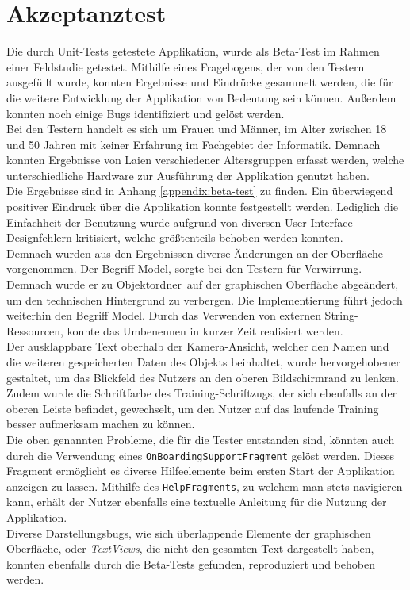 \documentclass[oneside]{ausarbeitung}
\begin{document}
\section{Akzeptanztest}
Die durch Unit-Tests getestete Applikation, wurde als Beta-Test im Rahmen einer Feldstudie getestet. Mithilfe eines Fragebogens, der von den Testern ausgefüllt wurde, konnten Ergebnisse und Eindrücke gesammelt werden, die für die weitere Entwicklung der Applikation von Bedeutung sein können. Außerdem konnten noch einige Bugs identifiziert und gelöst werden.\\
Bei den Testern handelt es sich um Frauen und Männer, im Alter zwischen 18 und 50 Jahren mit keiner Erfahrung im Fachgebiet der Informatik. Demnach konnten Ergebnisse von Laien verschiedener Altersgruppen erfasst werden, welche unterschiedliche Hardware zur Ausführung der Applikation genutzt haben.\\
Die Ergebnisse sind in Anhang \ref{appendix:beta-test} zu finden. Ein überwiegend positiver Eindruck über die Applikation konnte festgestellt werden. Lediglich die Einfachheit der Benutzung wurde aufgrund von diversen User-Interface-Designfehlern kritisiert, welche größtenteils behoben werden konnten.\\
Demnach wurden aus den Ergebnissen diverse Änderungen an der Oberfläche vorgenommen. Der Begriff \glqq Model\grqq, sorgte bei den Testern für Verwirrung. Demnach wurde er zu \glqq Objektordner\grqq\ auf der graphischen Oberfläche abgeändert, um den technischen Hintergrund zu verbergen. Die Implementierung führt jedoch weiterhin den Begriff Model. Durch das Verwenden von externen String-Ressourcen, konnte das Umbenennen in kurzer Zeit realisiert werden. \\
Der ausklappbare Text oberhalb der Kamera-Ansicht, welcher den Namen und die weiteren gespeicherten Daten des Objekts beinhaltet, wurde hervorgehobener gestaltet, um das Blickfeld des Nutzers an den oberen Bildschirmrand zu lenken. Zudem wurde die Schriftfarbe des \glqq Training\grqq-Schriftzugs, der sich ebenfalls an der oberen Leiste befindet, gewechselt, um den Nutzer auf das laufende Training besser aufmerksam machen zu können.\\
Die oben genannten Probleme, die für die Tester entstanden sind, könnten auch durch die Verwendung eines \texttt{OnBoardingSupportFragment} gelöst werden. Dieses Fragment ermöglicht es diverse Hilfeelemente beim ersten Start der Applikation anzeigen zu lassen. Mithilfe des \texttt{HelpFragments}, zu welchem man stets navigieren kann, erhält der Nutzer ebenfalls eine textuelle Anleitung für die Nutzung der Applikation.\\
Diverse Darstellungsbugs, wie sich überlappende Elemente der graphischen Oberfläche, oder \textit{TextViews}, die nicht den gesamten Text dargestellt haben, konnten ebenfalls durch die Beta-Tests gefunden, reproduziert und behoben werden.
\end{document}
